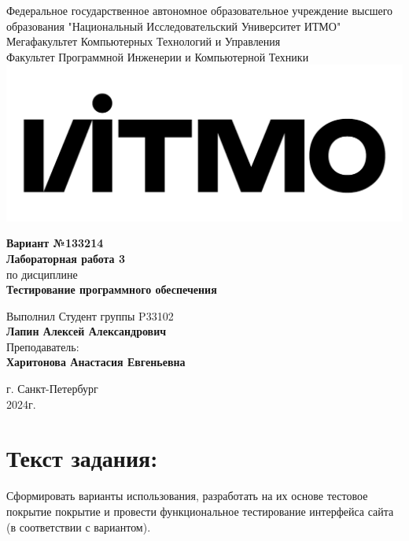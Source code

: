 \documentclass[12pt,onecolumn]{article}
\begin{document}
\setcounter{tocdepth}{4}
\begin{center}
  Федеральное государственное автономное образовательное учреждение высшего образования "Национальный Исследовательский Университет ИТМО"\\
  Мегафакультет Компьютерных Технологий и Управления\\
  Факультет Программной Инженерии и Компьютерной Техники \\
  \includegraphics[scale=0.3]{image/itmo.jpg} %
\end{center}
\vspace{1cm}


\begin{center}
  \large \textbf{Вариант №133214}\\
  \textbf{Лабораторная работа 3}\\
  по дисциплине\\
  \textbf{Тестирование программного обеспечения}
\end{center}

\vspace{2cm}

\begin{flushright}
  Выполнил Студент  группы P33102\\
  \textbf{Лапин Алексей Александрович}\\
  Преподаватель: \\
  \textbf{Харитонова Анастасия Евгеньевна}\\
\end{flushright}

\vspace{9cm}
\begin{center}
  г. Санкт-Петербург\\
  2024г.
\end{center}
\pagestyle{empty}
\newpage
\section*{Текст задания:}
Сформировать варианты использования, разработать на их основе тестовое покрытие покрытие и провести функциональное тестирование интерфейса сайта (в соответствии с вариантом).
\end{document}
